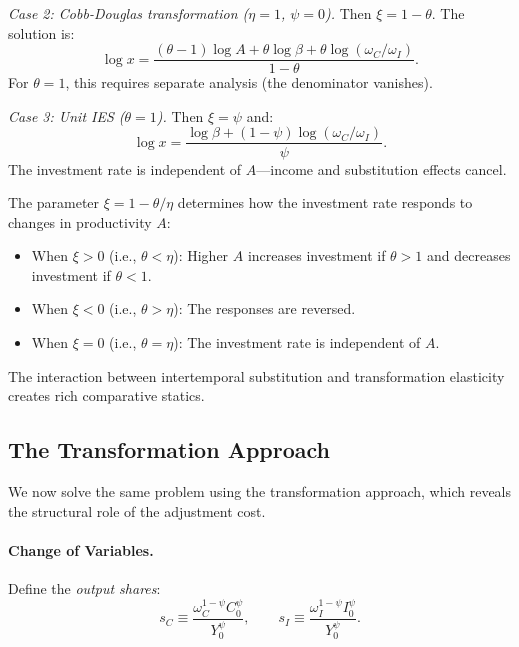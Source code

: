 \medskip
\noindent
\textit{Case 2: Cobb-Douglas transformation ($\eta = 1$, $\psi = 0$).} Then $\xi = 1 - \theta$. The solution is:
\begin{equation}
\log x = \frac{(\theta - 1) \log A + \theta \log \beta + \theta \log(\omega_C / \omega_I)}{1 - \theta}.
\label{eq:ac-cobb-douglas}
\end{equation}
For $\theta = 1$, this requires separate analysis (the denominator vanishes).

\medskip
\noindent
\textit{Case 3: Unit IES ($\theta = 1$).} Then $\xi = \psi$ and:
\begin{equation}
\log x = \frac{\log \beta + (1-\psi) \log(\omega_C / \omega_I)}{\psi}.
\label{eq:ac-unit-ies}
\end{equation}
The investment rate is independent of $A$---income and substitution effects cancel.

\begin{calloutnote}
The parameter $\xi = 1 - \theta/\eta$ determines how the investment rate responds to changes in productivity $A$:
\begin{itemize}[nosep]
\item When $\xi > 0$ (i.e., $\theta < \eta$): Higher $A$ increases investment if $\theta > 1$ and decreases investment if $\theta < 1$.
\item When $\xi < 0$ (i.e., $\theta > \eta$): The responses are reversed.
\item When $\xi = 0$ (i.e., $\theta = \eta$): The investment rate is independent of $A$.
\end{itemize}
The interaction between intertemporal substitution and transformation elasticity creates rich comparative statics.
\end{calloutnote}

\subsection{The Transformation Approach}
\label{subsec:ac-transformation}

We now solve the same problem using the transformation approach, which reveals the structural role of the adjustment cost.

\paragraph{Change of Variables.}
Define the \emph{output shares}:
\begin{equation}
s_C \equiv \frac{\omega_C^{1-\psi} C_0^{\psi}}{Y_0^{\psi}}, \qquad s_I \equiv \frac{\omega_I^{1-\psi} I_0^{\psi}}{Y_0^{\psi}}.
\label{eq:ac-shares-def}
\end{equation}

